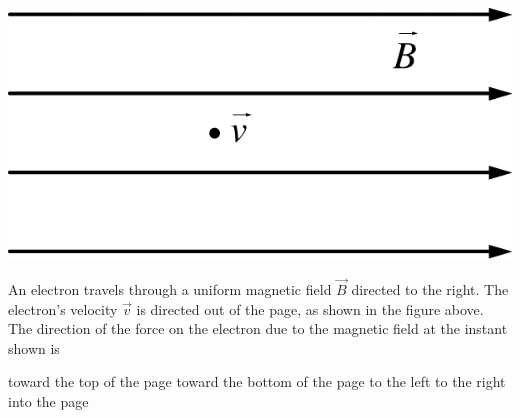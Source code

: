 \begin{center}
    \includegraphics[scale=0.3]{images/img-002-003.png}
\end{center}

\begin{questions}\setcounter{question}{1}\question
An electron travels through a uniform magnetic field $\vec{B}$ directed to the right. The electron's velocity $\vec{v}$ is directed out of the page, as shown in the figure above. The direction of the force on the electron due to the magnetic field at the instant shown is

\begin{choices}
\choice toward the top of the page
\choice toward the bottom of the page
\choice to the left
\choice to the right
\choice into the page
\end{choices}\end{questions}
